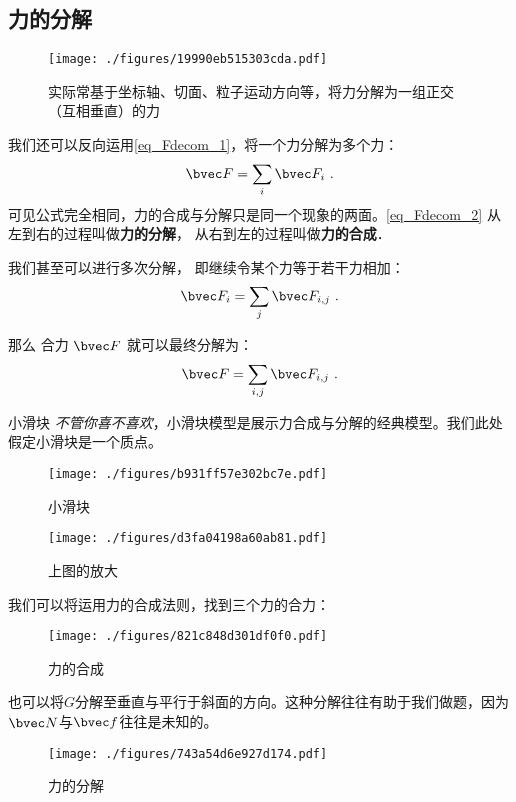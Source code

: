 \subsection{力的分解}
\begin{figure}[ht]
\centering
\texttt{[image: ./figures/19990eb515303cda.pdf]}
\caption{实际常基于坐标轴、切面、粒子运动方向等，将力分解为一组正交（互相垂直）的力} \label{fig_Fdecom_1}
\end{figure}
我们还可以反向运用\autoref{eq_Fdecom_1}，将一个力分解为多个力：
\begin{equation}\label{eq_Fdecom_2}
\bvec F = \sum_i \bvec F_{i}~.
\end{equation}
可见公式完全相同，力的合成与分解只是同一个现象的两面。\autoref{eq_Fdecom_2} 从左到右的过程叫做\textbf{力的分解}， 从右到左的过程叫做\textbf{力的合成}．

我们甚至可以进行多次分解， 即继续令某个力等于若干力相加：
\begin{equation}
\bvec F_i = \sum_j \bvec F_{i,j}~.
\end{equation}

那么 合力 $\bvec F$ 就可以最终分解为：
\begin{equation}
\bvec F = \sum_{i,j} \bvec F_{i,j}~.
\end{equation}


\begin{example}{小滑块}
\textsl{不管你喜不喜欢}，小滑块模型是展示力合成与分解的经典模型。我们此处假定小滑块是一个质点。
\begin{figure}[ht]
\centering
\texttt{[image: ./figures/b931ff57e302bc7e.pdf]}
\caption{小滑块} \label{fig_Fdecom_4}
\end{figure}

\begin{figure}[ht]
\centering
\texttt{[image: ./figures/d3fa04198a60ab81.pdf]}
\caption{上图的放大} \label{fig_Fdecom_10}
\end{figure}

我们可以将运用力的合成法则，找到三个力的合力：
\begin{figure}[ht]
\centering
\texttt{[image: ./figures/821c848d301df0f0.pdf]}
\caption{力的合成} \label{fig_Fdecom_5}
\end{figure}

也可以将$G$分解至垂直与平行于斜面的方向。这种分解往往有助于我们做题，因为$\bvec N$与$\bvec f$往往是未知的。
\begin{figure}[ht]
\centering
\texttt{[image: ./figures/743a54d6e927d174.pdf]}
\caption{力的分解} \label{fig_Fdecom_6}
\end{figure}

\end{example}

